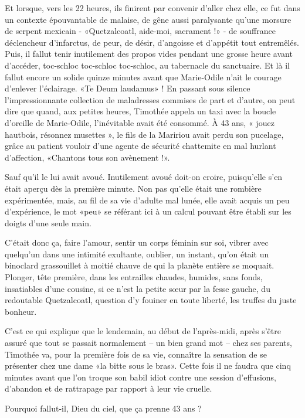 Et lorsque, vers les 22 heures, ils finirent par convenir d’aller chez elle, ce fut dans un contexte épouvantable de malaise, de gêne aussi paralysante qu’une morsure de serpent mexicain - «Quetzalcoatl, aide-moi, sacrament !» - de souffrance déclencheur d’infarctus, de peur, de désir, d’angoisse et d’appétit tout entremêlés. Puis, il fallut tenir inutilement des propos vides pendant une grosse heure avant d’accéder, toc-schloc toc-schloc toc-schloc, au tabernacle du sanctuaire. Et là il fallut encore un solide quinze minutes avant que Marie-Odile n’ait le courage d’enlever l’éclairage. «Te Deum laudamus» ! En passant sous silence l’impressionnante collection de maladresses commises de part et d’autre, on peut dire que quand, aux petites heures, Timothée appela un taxi avec la boucle d’oreille de Marie-Odile, l’inévitable avait été consommé. À 43 ans, « jouez hautbois, résonnez musettes », le fils de la Maririou avait perdu son pucelage, grâce au patient vouloir d’une agente de sécurité chattemite en mal hurlant d’affection, «Chantons tous son avènement !».

Sauf qu’il le lui avait avoué. Inutilement avoué doit-on croire, puisqu’elle s’en était aperçu dès la première minute. Non pas qu’elle était une rombière expérimentée, mais, au fil de sa vie d’adulte mal lunée, elle avait acquis un peu d’expérience, le mot «peu» se référant ici à un calcul pouvant être établi sur les doigts d’une seule main.

C’était donc ça, faire l’amour, sentir un corps féminin sur soi, vibrer avec quelqu’un dans une intimité exultante, oublier, un instant, qu’on était un binoclard grassouillet à moitié chauve de qui la planète entière se moquait. Plonger, tête première, dans les entrailles chaudes, humides, sans fonds, insatiables d’une cousine, si ce n’est la petite sœur par la fesse gauche, du redoutable Quetzalcoatl, question d’y fouiner en toute liberté, les truffes du juste bonheur.

C’est ce qui explique que le lendemain, au début de l’après-midi, après s’être assuré que tout se passait normalement – un bien grand mot – chez ses parents, Timothée va, pour la première fois de sa vie, connaître la sensation de se présenter chez une dame «la bitte sous le bras». Cette fois il ne faudra que cinq minutes avant que l’on troque son babil idiot contre une session d’effusions, d’abandon et de rattrapage par rapport à leur vie cruelle.

Pourquoi fallut-il, Dieu du ciel, que ça prenne 43 ans ?

